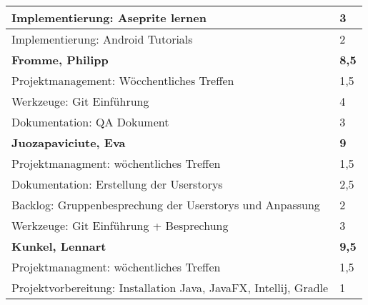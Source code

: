 \documentclass[a4paper,11pt]{scrartcl}
\begin{document}
\begin{longtable}{| p{13.8cm} | C{2.4cm} |}
  Implementierung: Aseprite lernen
	&
  3
	\\
	\hline
	
  Implementierung: Android Tutorials
	&
  2
	\\
	\hline
	\hline


	\textbf{Fromme, Philipp} & \textbf{8,5}\\ %
	\hline

	Projektmanagement: Wöcchentliches Treffen
	&
	1,5
	\\
	\hline

	Werkzeuge: Git Einführung
	&
	4
	\\
	\hline

  Dokumentation: QA Dokument
	&
  3
	\\
	\hline
	\hline


	\textbf{Juozapaviciute, Eva} & \textbf{9}\\ %
	\hline

  Projektmanagment: wöchentliches Treffen
	&
  1,5
	\\
	\hline

  Dokumentation: Erstellung der Userstorys
	&
  2,5
	\\
	\hline

  Backlog: Gruppenbesprechung der Userstorys und Anpassung
	&
  2
	\\
	\hline

  Werkzeuge: Git Einführung + Besprechung
	&
  3
	\\
	\hline
	\hline


	\textbf{Kunkel, Lennart} & \textbf{9,5}\\ %
	\hline

  Projektmanagment: wöchentliches Treffen
	&
  1,5
	\\
	\hline

  Projektvorbereitung: Installation Java, JavaFX, Intellij, Gradle
	&
  1
	\\
	\hline


\end{longtable}
\end{document}
